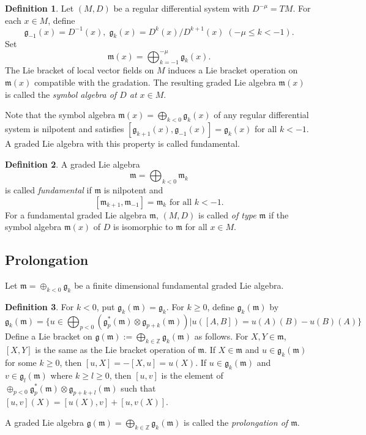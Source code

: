 \documentclass{amsart}
\theoremstyle{definition}
\newtheorem{definition}{Definition}
\theoremstyle{remark}
\newcommand{\Z}{\mathbb{Z}}
\newcommand{\g}{\mathfrak{g}}
\newcommand{\m}{\mathfrak{m}}
\begin{document}
\begin{definition}
Let $(M, D)$ be a regular differential system with $D^{-\mu} = TM$. For each \(x \in M\), define \[\mathfrak{g}_{-1}(x) = D^{-1}(x), \; \mathfrak{g}_{k}(x) = D^k(x)/D^{k+1}(x) \; (-\mu \leq k < -1).\] 
Set 
\[\m(x) = \bigoplus_{k = -1}^{-\mu} \g_k (x).\]
The Lie bracket of local vector fields on $M$ induces a Lie bracket operation on $\m(x)$ compatible with the gradation. The resulting graded Lie algebra $\m(x)$ is called the {\it symbol algebra of $D$ at $x \in M$}.
\end{definition}

Note that the symbol algebra $\m(x) = \bigoplus_{k < 0} \g_k(x)$ of any regular differential system is nilpotent and satisfies $[\g_{k+1}(x), \g_{-1}(x)] = \g_k(x)$ for all $k < -1$. A graded Lie algebra with this property is called fundamental.


\begin{definition}
A graded Lie algebra 
\[\m = \bigoplus_{k < 0} \m_k\]
is called {\it fundamental} if $\m$ is nilpotent and \[[\m_{k+1}, \m_{-1}] = \m_k \text{ for all } k < -1.\] For a fundamental graded Lie algebra $\m$, $(M, D)$ is called {\it of type $\m$} if the symbol algebra $\m(x)$ of $D$ is isomorphic to $\m$ for all $x \in M$.
\end{definition}


\subsection{Prolongation}

Let $\m = \oplus_{k < 0} \g_k$ be a finite dimensional fundamental graded Lie algebra.

\begin{definition}
For $k < 0$, put $\g_k(\m) = \g_k$. For $k \geq 0$, define $\g_k(\m)$ by
\[
\g_k(\m) = \{u \in \bigoplus_{p < 0} (\g_{p}^*(\m) \otimes \g_{p+k}(\m)) | u([A, B]) = u(A)(B) - u(B)(A) \}
\]
Define a Lie bracket on $\g(\m) := \bigoplus_{k \in \Z} \g_k(\m)$ as follows. For $X, Y \in \m$, $[X, Y]$ is the same as the Lie bracket operation of $\m$. If $X \in \m$ and $u \in \g_k(\m)$ for some $ k \geq 0$, then $[u, X] = -[X, u] = u(X)$. If $u \in \g_k(\m)$ and $v \in \g_l(\m)$ where $k \geq l \geq 0$, then $[u, v]$ is the element of $ \oplus_{p < 0} \g_{p}^*(\m) \otimes \g_{p+k+l}(\m)$ such that $[u, v](X) = [u(X), v] + [u, v(X)]$.

A graded Lie algebra $\g(\m) = \bigoplus_{k \in \Z} \g_k(\m)$ is called the {\it prolongation of $\m$}.
\end{definition}
\end{document}
